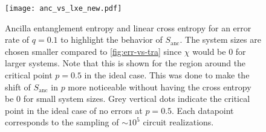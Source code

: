 %
%    
%
\begin{figure}[p]
  \centering
  \texttt{[image: anc\_vs\_lxe\_new.pdf]}
  \caption{Ancilla entanglement entropy and linear cross entropy for an error
  rate of $q=0.1$ to highlight the behavior of $S_\mathrm{anc}$. The system sizes are chosen smaller compared to
\cref{fig:err-vs-tra} since $\chi$ would be $0$ for larger systems. Note that
this is shown for the region around the critical point $p=0.5$ in the ideal
case. This was done to make the shift of $S_\mathrm{anc}$ in $p$ more
noticeable without having the cross entropy be $0$ for small
system sizes. Grey vertical dots indicate the critical point in the ideal case
of no errors at $p = 0.5$. Each datapoint corresponds to the sampling of $\sim 10^5$ circuit realizations.}
  \label{fig:large-q-anc-vs-lxe}
\end{figure}


